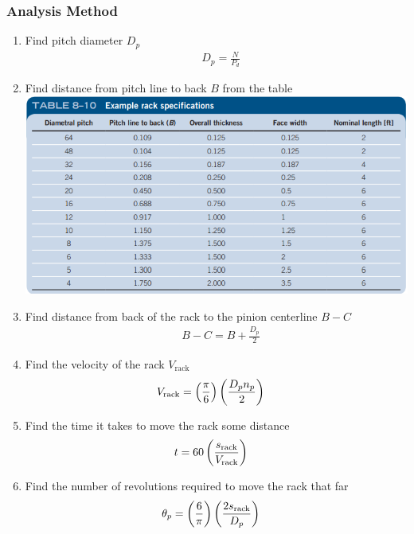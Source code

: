 \documentclass[11pt, fleqn]{article}
\begin{document}
\subsubsection{Analysis Method}
\begin{enumerate}
    \item Find pitch diameter $D_p$
    \begin{align*}
        &D_p=\frac{N}{P_d}
    \end{align*}
    \item Find distance from pitch line to back $B$ from the table\\
    \includegraphics[scale=1]{Gears/8-10.png}
    \item Find distance from back of the rack to the pinion centerline $B-C$
    \begin{align*}
        &B-C=B+\frac{D_p}{2}
    \end{align*}
    \item Find the velocity of the rack $V_\text{rack}$
    \begin{align*}
        &V_\text{rack}=\left( \frac{\pi}{6} \right)\left( \frac{D_pn_p}{2} \right)
    \end{align*}
    \item Find the time it takes to move the rack some distance
    \begin{align*}
        &t=60\left( \frac{s_\text{rack}}{V_\text{rack}} \right)
    \end{align*}
    \item Find the number of revolutions required to move the rack that far
    \begin{align*}
        &\theta_p=\left( \frac{6}{\pi} \right)\left( \frac{2s_\text{rack}}{D_p} \right)
    \end{align*}
\end{enumerate}
\end{document}
